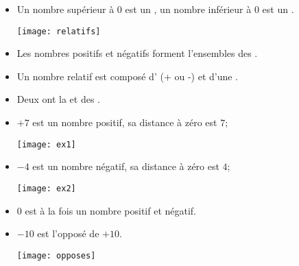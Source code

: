 \begin{mydefs}
	\begin{itemize}
		\item Un nombre supérieur à 0 est un , un nombre inférieur à 0 est un .
		
		\begin{center}
			\texttt{[image: relatifs]}
		\end{center}
		
		\item Les nombres positifs et négatifs forment l'ensembles des .
		
		\item Un nombre relatif est composé d' (+ ou -) et d'une .
		
		\item Deux  ont la  et des  .
		
		
	\end{itemize}
\end{mydefs}


\begin{myexs}
	\begin{itemize}
		\item $+7$ est un nombre positif, sa distance à zéro est $7$; 
		\begin{center}
			\texttt{[image: ex1]}
		\end{center}
		\item $\num{-4}$ est un nombre négatif, sa distance à zéro est $\num{4}$;
		\begin{center}
			\texttt{[image: ex2]}
		\end{center}
	
		\item $0$ est à la fois un nombre positif et négatif.%
		\item $-10$ est l'opposé de $+10$.
		\begin{center}
			\texttt{[image: opposes]}
		\end{center}
	\end{itemize}
\end{myexs}